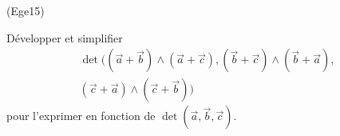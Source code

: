 \begin{tiny}(Ege15)\end{tiny} Développer et simplifier
\begin{multline*}
 \det(
(\overrightarrow  a + \overrightarrow b )\wedge (\overrightarrow  a + \overrightarrow c),
(\overrightarrow  b + \overrightarrow c )\wedge (\overrightarrow  b + \overrightarrow a),\\
(\overrightarrow  c + \overrightarrow a )\wedge (\overrightarrow  c + \overrightarrow b)
)
\end{multline*}
pour l'exprimer en fonction de $\det(\overrightarrow a,\overrightarrow b,\overrightarrow c)$.
